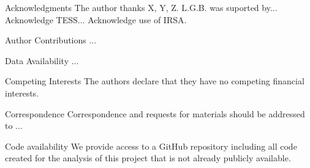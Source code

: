 \documentclass{nature3}
\begin{document}
\begin{addendum}

\item[Acknowledgments]
  The author thanks X, Y, Z.
  L.G.B. was suported by...
	Acknowledge TESS...
  Acknowledge use of IRSA.


\item[Author Contributions] ...

\item[Data Availability] ...

\item[Competing Interests] The authors declare that they have no competing
financial interests.
 
\item[Correspondence] Correspondence and requests for materials should be
addressed to ...
 
\item[Code availability] We provide access to a GitHub repository including all
code created for the analysis of this project that is not already publicly
available.

\end{addendum}
\end{document}
